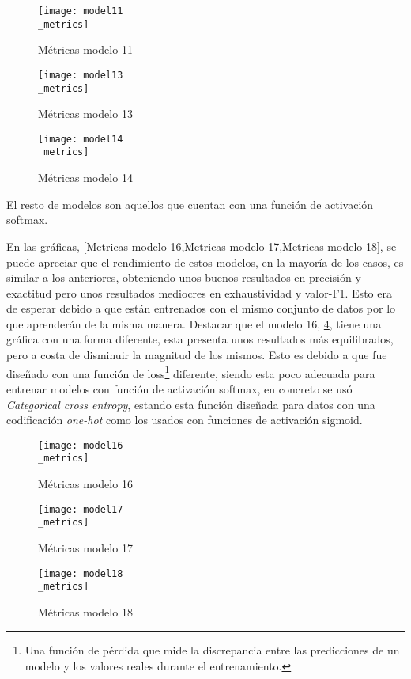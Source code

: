 \begin{figure}[H]
    \centering
    \texttt{[image: model11\\\_metrics]}
    \captionsetup{justification=centering}
    \caption{Métricas modelo 11}
    \label{Metricas modelo 11}
\end{figure}
\begin{figure}[H]
    \centering
    \texttt{[image: model13\\\_metrics]}
    \captionsetup{justification=centering}
    \caption{Métricas modelo 13}
    \label{Metricas modelo 13}
\end{figure}
\begin{figure}[H]
    \centering
    \texttt{[image: model14\\\_metrics]}
    \captionsetup{justification=centering}
    \caption{Métricas modelo 14}
    \label{Metricas modelo 14}
\end{figure}

El resto de modelos son aquellos que cuentan con una función de activación
softmax.

En las gráficas, \cref{Metricas modelo 16,Metricas modelo 17,Metricas modelo 18},
se puede apreciar que el rendimiento de estos modelos, en la mayoría de los
casos, es similar a los anteriores, obteniendo unos buenos resultados en
precisión y exactitud pero unos resultados mediocres en exhaustividad y
valor-F1. Esto era de esperar debido a que están entrenados con el mismo
conjunto de datos por lo que aprenderán de la misma manera. Destacar que el
modelo 16, \cref{Metricas modelo 16}, tiene una gráfica con una forma diferente,
esta presenta unos resultados más equilibrados, pero a costa de disminuir la
magnitud de los mismos. Esto es debido a que fue diseñado con una función de
loss\footnote{Una función de pérdida que mide la discrepancia entre las predicciones de un modelo y los valores reales durante el entrenamiento.} diferente, siendo esta poco adecuada para entrenar
modelos con función de activación softmax, en concreto se usó
\textit{Categorical cross entropy}, estando esta función diseñada para datos con
una codificación \textit{one-hot} como los usados con funciones de activación
sigmoid.
\begin{figure}[H]
    \centering
    \texttt{[image: model16\\\_metrics]}
    \captionsetup{justification=centering}
    \caption{Métricas modelo 16}
    \label{Metricas modelo 16}
\end{figure}
\begin{figure}[H]
    \centering
    \texttt{[image: model17\\\_metrics]}
    \captionsetup{justification=centering}
    \caption{Métricas modelo 17}
    \label{Metricas modelo 17}
\end{figure}
\begin{figure}[H]
    \centering
    \texttt{[image: model18\\\_metrics]}
    \captionsetup{justification=centering}
    \caption{Métricas modelo 18}
    \label{Metricas modelo 18}
\end{figure}



